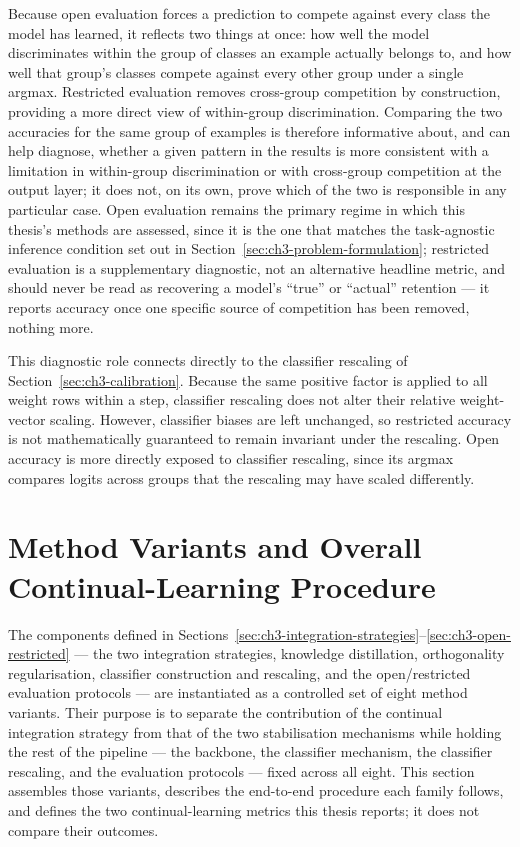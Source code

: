 Because open evaluation forces a prediction to compete against every class
the model has learned, it reflects two things at once: how well the model
discriminates within the group of classes an example actually belongs to,
and how well that group's classes compete against every other group under
a single argmax. Restricted evaluation removes cross-group competition by
construction, providing a more direct view of within-group discrimination.
Comparing the two accuracies for the
same group of examples is therefore informative about, and can help
diagnose, whether a given pattern in the results is more consistent with a
limitation in within-group discrimination or with cross-group competition
at the output layer; it does not, on its own, prove which of the two is
responsible in any particular case. Open evaluation remains the primary
regime in which this thesis's methods are assessed, since it is the one
that matches the task-agnostic inference condition set out in Section~\ref{sec:ch3-problem-formulation};
restricted evaluation is a supplementary diagnostic, not an alternative
headline metric, and should never be read as recovering a model's ``true''
or ``actual'' retention --- it reports accuracy once one specific source of
competition has been removed, nothing more.

This diagnostic role connects directly to the classifier rescaling of
Section~\ref{sec:ch3-calibration}. Because the same positive factor is
applied to all weight rows within a step, classifier rescaling does not
alter their relative weight-vector scaling. However, classifier biases are
left unchanged, so restricted accuracy is not mathematically guaranteed to
remain invariant under the rescaling. Open accuracy is more directly
exposed to classifier rescaling, since its argmax compares logits across
groups that the rescaling may have scaled differently.

\section{Method Variants and Overall Continual-Learning Procedure}
\label{sec:ch3-method-variants}

The components defined in Sections~\ref{sec:ch3-integration-strategies}--\ref{sec:ch3-open-restricted} --- the two integration
strategies, knowledge distillation, orthogonality regularisation, classifier
construction and rescaling, and the open/restricted evaluation
protocols --- are instantiated as a controlled set of eight method variants.
Their purpose is to separate the contribution of the continual integration
strategy from that of the two stabilisation mechanisms while holding the
rest of the pipeline --- the backbone, the classifier mechanism, the
classifier rescaling, and the evaluation protocols --- fixed across all
eight. This section assembles those variants, describes the end-to-end
procedure each family follows, and defines the two continual-learning
metrics this thesis reports; it does not compare their outcomes.

